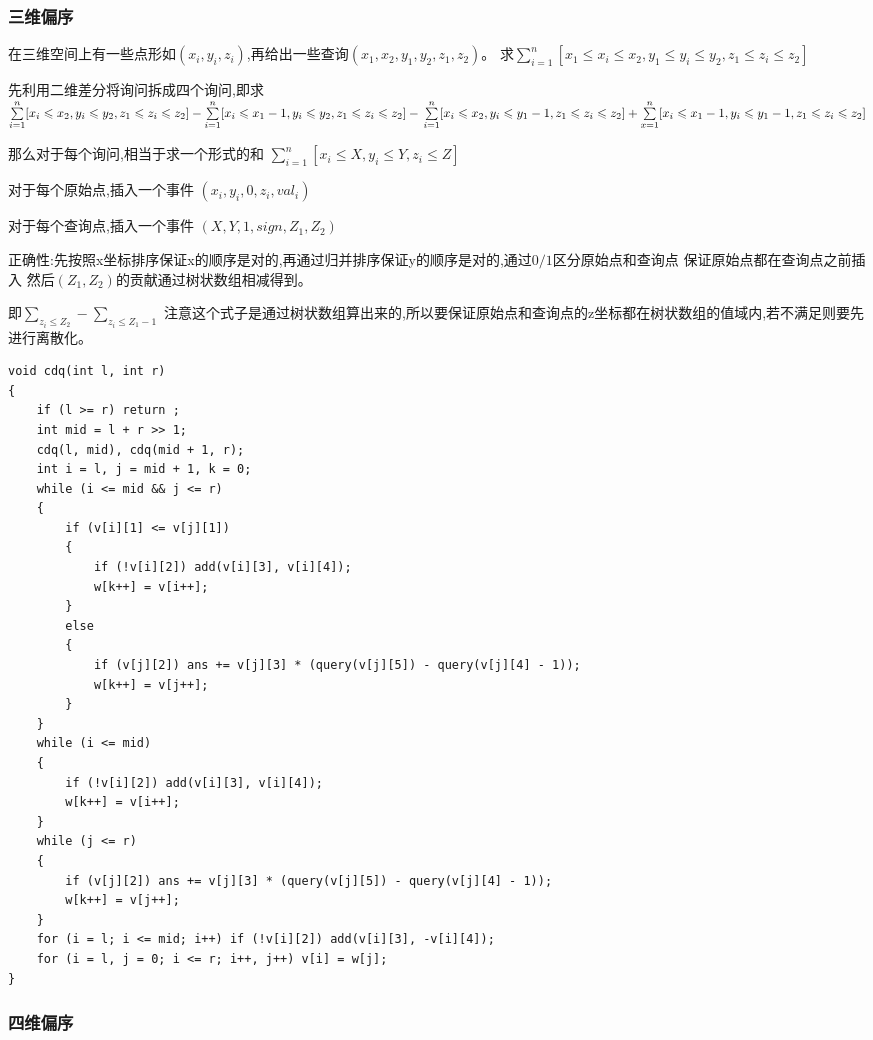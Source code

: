 \documentclass[a4paper,fontset=none]{ctexart}
\begin{document}
\subsubsection{三维偏序}
在三维空间上有一些点形如$(x_i,y_i,z_i)$,再给出一些查询$(x_1,x_2,y_1,y_2,z_1,z_2)$。
求$\sum\limits_{i=1}^n[x_1\leqslant x_i\leqslant x_2,y_1\leqslant y_i\leqslant y_2,z_1\leqslant z_i\leqslant z_2]$

先利用二维差分将询问拆成四个询问,即求$\sum\limits_{i=1}^n[x_i\leqslant x_2,y_i\leqslant y_2,z_1\leqslant z_i\leqslant z_2]-
\sum\limits_{i=1}^n[x_i\leqslant x_1-1,y_i\leqslant y_2,z_1\leqslant z_i\leqslant z_2]-
\\\sum\limits_{i=1}^n[x_i\leqslant x_2,y_i\leqslant y_1-1,z_1\leqslant z_i\leqslant z_2]+
\sum\limits_{x=1}^n[x_i\leqslant x_1-1,y_i\leqslant y_1-1,z_1\leqslant z_i\leqslant z_2]$

那么对于每个询问,相当于求一个形式的和 $\sum\limits_{i=1}^n[x_i\leqslant X,y_i\leqslant Y,z_i\leqslant Z]$

对于每个原始点,插入一个事件 $(x_i,y_i,0,z_i,val_i)$

对于每个查询点,插入一个事件 $(X,Y,1,sign,Z_1,Z_2)$

正确性:先按照x坐标排序保证x的顺序是对的,再通过归并排序保证y的顺序是对的,通过$0/1$区分原始点和查询点 
保证原始点都在查询点之前插入 然后$(Z_1,Z_2)$的贡献通过树状数组相减得到。

即$\sum\limits_{z_i\leqslant Z_2}-\sum\limits_{z_i\leqslant Z_1-1}$  
注意这个式子是通过树状数组算出来的,所以要保证原始点和查询点的z坐标都在树状数组的值域内,若不满足则要先进行离散化。
\begin{verbatim}
void cdq(int l, int r)
{
    if (l >= r) return ;
    int mid = l + r >> 1;
    cdq(l, mid), cdq(mid + 1, r);
    int i = l, j = mid + 1, k = 0;
    while (i <= mid && j <= r)
    {
        if (v[i][1] <= v[j][1])
        {
            if (!v[i][2]) add(v[i][3], v[i][4]);
            w[k++] = v[i++];
        }
        else
        {
            if (v[j][2]) ans += v[j][3] * (query(v[j][5]) - query(v[j][4] - 1));
            w[k++] = v[j++];
        }
    }
    while (i <= mid)
    {
        if (!v[i][2]) add(v[i][3], v[i][4]);
        w[k++] = v[i++];
    }
    while (j <= r)
    {
        if (v[j][2]) ans += v[j][3] * (query(v[j][5]) - query(v[j][4] - 1));
        w[k++] = v[j++];
    }
    for (i = l; i <= mid; i++) if (!v[i][2]) add(v[i][3], -v[i][4]);
    for (i = l, j = 0; i <= r; i++, j++) v[i] = w[j];
}
\end{verbatim}
\subsubsection{四维偏序}
\end{document}
